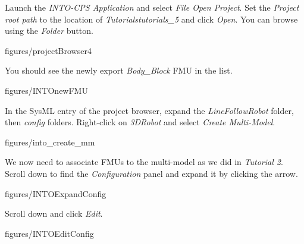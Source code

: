 \documentclass[11pt,a4paper]{../tutorial}
\begin{document}
\begin{instructions}
\item Launch the \emph{INTO-CPS Application} and select \emph{File \menusep Open Project}. Set the \emph{Project root path} to the location of \emph{Tutorials\pathsep{}tutorials\_5} and click \emph{Open}. You can browse using the \emph{Folder} button.

    \begin{annotation}[width=0.35\linewidth,trim=0 0 0 0,clip]{figures/projectBrowser4}
    \end{annotation}

    You should see the newly export \emph{Body\_Block} FMU in the list.

    \begin{annotation}[height=0.5\linewidth,trim=0 125 250 0,clip]{figures/INTOnewFMU}
    \end{annotation}

\item In the SysML entry of the project browser, expand the \emph{LineFollowRobot} folder, then \emph{config} folders. Right-click on \emph{3DRobot} and select \emph{Create Multi-Model}.

    \begin{annotation}[width=0.35\linewidth,trim=0 40 375 300,clip]{figures/into_create_mm}
    \end{annotation}

\newpage
\item We now need to associate FMUs to the multi-model as we did in \emph{Tutorial 2}. Scroll down to find the \emph{Configuration} panel and expand it by clicking the arrow.

    \begin{annotation}[width=0.85\linewidth,trim=0 0 0 250,clip]{figures/INTOExpandConfig}
    \end{annotation}

\item Scroll down and click \emph{Edit}.

    \begin{annotation}[width=0.85\linewidth,trim=0 0 0 260,clip]{figures/INTOEditConfig}
    \end{annotation}


\end{instructions}
\end{document}
